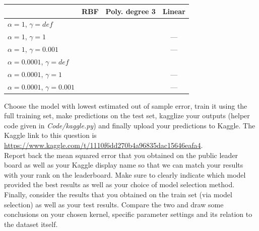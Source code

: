 \documentclass[11pt]{article}
\begin{document}
\begin{problem}{75}
\begin{description}
\begin{table}[H]
\centering
\begin{tabular}{|l|c|c|c|}
\hline
                                    & RBF & Poly. degree 3 & Linear \\\hline
$\alpha = 1$, $\gamma = def$        &     &       &        \\\hline
$\alpha = 1$, $\gamma = 1$          &     &       & ---    \\\hline
$\alpha = 1$, $\gamma = 0.001$      &     &       & ---    \\\hline
$\alpha = 0.0001$, $\gamma = def$   &     &       &        \\\hline
$\alpha = 0.0001$, $\gamma = 1$     &     &       & ---    \\\hline
$\alpha = 0.0001$, $\gamma = 0.001$ &     &       & ---    \\\hline
\end{tabular}
\end{table} 

Choose the model with lowest estimated out of sample error, train it using the full training set, make predictions on the test set, kagglize your outputs (helper code given in \textit{Code/kaggle.py}) and finally upload your predictions to Kaggle.
The Kaggle link to this question is\\
\url{https://www.kaggle.com/t/1110f6dd270b4a96835dac15646eafa4}.\\
Report back the mean squared error that you obtained on the public leader board as well as your Kaggle display name so that we can match your results with your rank on the leaderboard. Make sure to clearly indicate which model provided the best results as well as your choice of model selection method.
Finally, consider the results that you obtained on the train set (via model selection) as well as your test results.
Compare the two  and draw some conclusions on your chosen kernel, specific parameter settings and its relation to the dataset itself.

\end{description}
\end{problem}
\end{document}
